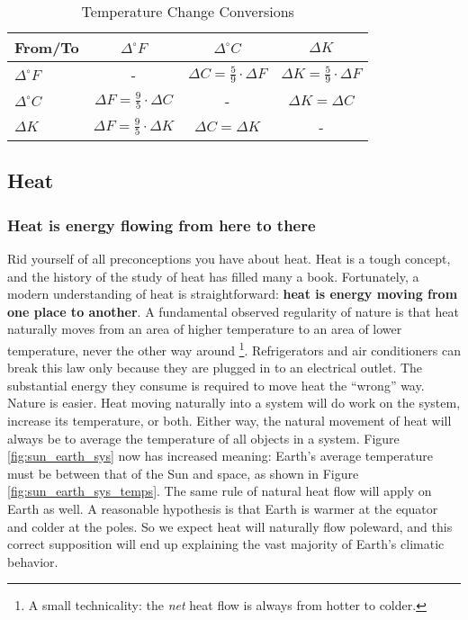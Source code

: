 \documentclass[amstex,12pt]{book}
\begin{document}
\begin{table}
\begin{center}
\caption{Temperature Change Conversions} \label{tab:t_change_conversions}
\begin{tabular}{@{}lccc@{}} \toprule
From/To &  $\Delta ^{\circ} F$ & $\Delta ^{\circ} C$ & $\Delta K$\\ \midrule \addlinespace[.4em]
$\Delta ^{\circ} F$ & - & $\Delta C=\frac{5}{9}\cdot\Delta F$ & $\Delta K=\frac{5}{9}\cdot\Delta F$\\ \addlinespace[.4em]
$\Delta ^{\circ} C$ & $\Delta F=\frac{9}{5}\cdot \Delta C$ & - & $\Delta K=\Delta C$\\ \addlinespace[.4em]
$\Delta K$ & $\Delta F=\frac{9}{5}\cdot \Delta K$ & $\Delta C=\Delta K$ & -\\ \midrule
\bottomrule
\end{tabular}
\end{center}
\end{table}

\subsection{Heat}
\subsubsection{Heat is energy flowing from here to there}
Rid yourself of all preconceptions you have about heat. Heat is a tough concept, and the history of the study of heat has filled many a book. Fortunately, a modern understanding of heat is straightforward: \textbf{heat is energy moving from one place to another}. A fundamental observed regularity of nature is that heat naturally moves from an area of higher temperature to an area of lower temperature, never the other way around \footnote{A small technicality: the \emph{net} heat flow is always from hotter to colder.}. Refrigerators and air conditioners can break this law only because they are plugged in to an electrical outlet. The substantial energy they consume is required to move heat the ``wrong'' way. Nature is easier. Heat moving naturally into a system will do work on the system, increase its temperature, or both. Either way, the natural movement of heat will always be to average the temperature of all objects in a system. Figure \ref{fig:sun_earth_sys} now has increased meaning: Earth's average temperature must be between that of the Sun and space, as shown in Figure \ref{fig:sun_earth_sys_temps}. The same rule of natural heat flow will apply on Earth as well. A reasonable hypothesis is that Earth is warmer at the equator and colder at the poles. So we expect heat will naturally flow poleward, and this correct supposition will end up explaining the vast majority of Earth's climatic behavior.
\end{document}
